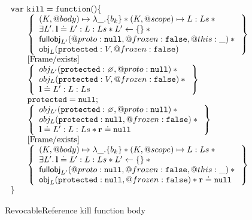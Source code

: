 \documentclass[a4paper,notitlepage]{report}
\begin{document}
\begin{figure}
\[
  \begin{array}{l}
    \jsvar{kill = function() \{} \\
    \indblock{
      \logic{
        (K, @body) \mapsto \lambda \_.\{b_k\} \sep (K, @scope) \mapsto L:Ls \sep {} \\
        \exists L' \st \ls \doteq L' : L : Ls \sep L' \bp \{\} \sep {} \\
        \fullobj_{L'}(@proto:\nil, @frozen:\false, @this:\_) \sep {} \\
        \obj_L(\js{protected}: V, @frozen: \false)
      } \\
      \step{Frame/exists} \\
      \logic{
        obj_{L'}(\js{protected}: \none, @proto: \nil) \sep {} \\
        obj_L(\js{protected}: V, @frozen: \false) \sep {} \\
        \ls \doteq L':L:Ls
      } \\
      \js{protected = null;} \\
      \logic{
        obj_{L'}(\js{protected}: \none, @proto: \nil) \sep {} \\
        obj_L(\js{protected}: \nil, @frozen: \false) \sep {} \\
        \ls \doteq L':L:Ls \sep \rv \doteq \nil
      } \\
      \step{Frame/exists} \\
      \logic{
        (K, @body) \mapsto \lambda \_.\{b_k\} \sep (K, @scope) \mapsto L:Ls \sep {} \\
        \exists L' \st \ls \doteq L' : L : Ls \sep L' \bp \{\} \sep {} \\
        \fullobj_{L'}(@proto:\nil, @frozen:\false, @this:\_) \sep {} \\
        \obj_L(\js{protected}: \nil, @frozen: \false) \sep \rv \doteq \nil
      }
    }
    \js{\}}
  \end{array}
\]
\caption{RevocableReference kill function body}
\label{rr-kill}
\end{figure}
\end{document}
